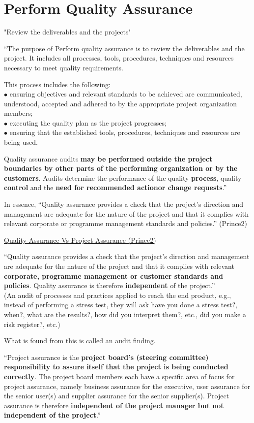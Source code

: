 \documentclass[]{project_plan}
\newcommand{\bulletPoint}{\hspace{-3.1pt}$\bullet$ \hspace{5pt}}
\begin{document}
\section{Perform Quality Assurance}

"Review the deliverables and the projects"

“The purpose of Perform quality assurance is to review the deliverables and the project. It includes all
processes, tools, procedures, techniques and resources necessary to meet quality requirements.

This process includes the following:\\
\bulletPoint ensuring objectives and relevant standards to be achieved are communicated, understood, accepted and
adhered to by the appropriate project organization members;\\
\bulletPoint executing the quality plan as the project progresses;\\
\bulletPoint ensuring that the established tools, procedures, techniques and resources are being used.

Quality assurance audits \textbf{may be performed outside the project boundaries by other parts of the performing
  organization or by the customers}. Audits determine the performance of the quality \textbf{process}, quality \textbf{control}
and the \textbf{need for recommended actionor change requests}.”

In essence, “Quality assurance provides a check that the project’s direction and management are adequate for
the nature of the project and that it complies with relevant corporate or programme management standards
and policies.” (Prince2)

\underline{Quality Assurance Vs Project Assurance (Prince2)}

“Quality
assurance provides a check that the project’s direction and management are adequate for the
nature of the project and that it complies with relevant \textbf{corporate, programme management or customer
  standards and policies}. Quality assurance is therefore \textbf{independent} of the project.”\\
(An audit of processes and practices applied to reach the end product, e.g., instead of performing a stress
test, they will ask have you done a stress test?, when?, what are the results?, how did you interpret them?,
etc., did you make a risk register?, etc.)

What is found from this is called an audit finding.

“Project
assurance is the \textbf{project board’s (steering committee) responsibility to assure itself that the project is being conducted
  correctly}. The project board members each have a specific area of focus for project assurance, namely
business assurance for the executive, user assurance for the senior user(s) and supplier assurance for the
senior supplier(s). Project assurance is therefore \textbf{independent of the project manager but not independent of
  the project}.”
\end{document}

